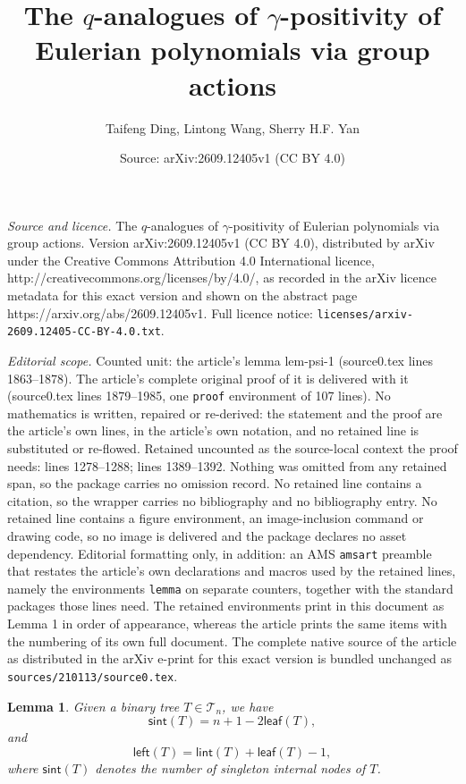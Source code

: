 \documentclass[10pt,a4paper]{amsart}
\title{The $q$-analogues of $\gamma$-positivity of Eulerian polynomials via group actions}
\author{Taifeng Ding, Lintong Wang, Sherry H.F. Yan}
\date{Source: arXiv:2609.12405v1 (CC BY 4.0)}
\newtheorem{lemma}{Lemma}
\def\B{\mathcal{T}}
\def\l{\mathsf{left}}
\def\leaf{\mathsf{leaf}}
\def\lint{\mathsf{lint}}
\def\sint{\mathsf{sint}}
\begin{document}
\maketitle

\noindent\emph{Source and licence.} The $q$-analogues of $\gamma$-positivity of Eulerian polynomials via group actions. Version arXiv:2609.12405v1 (CC BY 4.0), distributed by arXiv under the Creative Commons Attribution 4.0 International licence, http://creativecommons.org/licenses/by/4.0/, as recorded in the arXiv licence metadata for this exact version and shown on the abstract page https://arxiv.org/abs/2609.12405v1. Full licence notice: \texttt{licenses/arxiv-2609.12405-CC-BY-4.0.txt}.\par\smallskip

\noindent\textit{Editorial scope.} Counted unit: the article's lemma lem-psi-1 (source0.tex lines 1863--1878). The article's complete original proof of it is delivered with it (source0.tex lines 1879--1985, one \texttt{proof} environment of 107 lines). No mathematics is written, repaired or re-derived: the statement and the proof are the article's own lines, in the article's own notation, and no retained line is substituted or re-flowed.  Retained uncounted as the source-local context the proof needs: lines 1278--1288; lines 1389--1392.  Nothing was omitted from any retained span, so the package carries no omission record.  No retained line contains a citation, so the wrapper carries no bibliography and no bibliography entry.  No retained line contains a figure environment, an image-inclusion command or drawing code, so no image is delivered and the package declares no asset dependency.  Editorial formatting only, in addition: an AMS \texttt{amsart} preamble that restates the article's own declarations and macros used by the retained lines, namely the environments \texttt{lemma} on separate counters, together with the standard packages those lines need.  The retained environments print in this document as Lemma 1 in order of appearance, whereas the article prints the same items with the numbering of its own full document.  The complete native source of the article as distributed in the arXiv e-print for this exact version is bundled unchanged as \texttt{sources/210113/source0.tex}.
	 	\begin{lemma}\label{lem-tree}
	 		Given a binary tree $T\in \B_n$, we have
	 		\begin{equation}\label{eq-sint}
	 			\sint(T)=n+1-2\leaf(T),
	 		\end{equation}
	 		and 
	 		\begin{equation}\label{eq-left}
	 			\l(T)= \lint(T)+ \leaf(T)-1,
	 		\end{equation}
	 		where  $\sint(T)$  denotes the number of singleton internal nodes    of $T$.
	 	\end{lemma}
\end{document}
